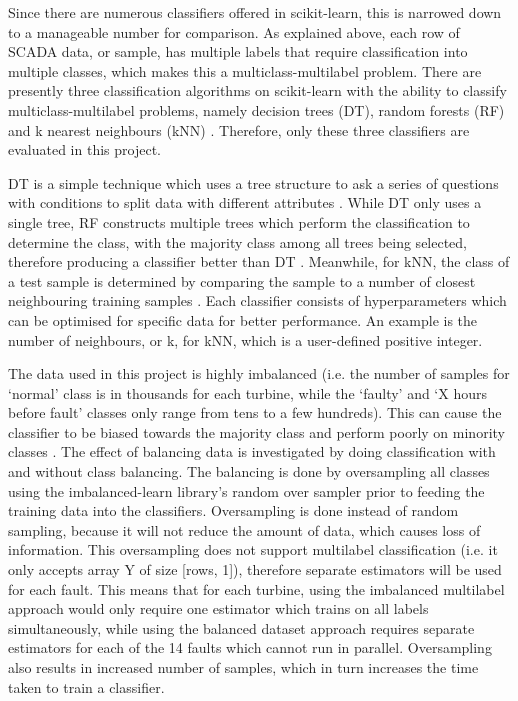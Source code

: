 Since there are numerous classifiers offered in scikit-learn, this is narrowed
down to a manageable number for comparison. As explained above, each row of
SCADA data, or sample, has multiple labels that require classification into
multiple classes, which makes this a multiclass-multilabel problem. There are
presently three classification algorithms on scikit-learn with the ability to
classify multiclass-multilabel problems, namely decision trees (DT), random
forests (RF) and k nearest neighbours (kNN) \cite{112}. Therefore, only these
three classifiers are evaluated in this project.

DT is a simple technique which uses a tree structure to ask a series of
questions with conditions to split data with different attributes
\cite{Decis10}. While DT only uses a single tree, RF constructs multiple trees
which perform the classification to determine the class, with the majority
class among all trees being selected, therefore producing a classifier better
than DT \cite{Rando}. Meanwhile, for kNN, the class of a test sample is
determined by comparing the sample to a number of closest neighbouring
training samples \cite{Sutto12,16N}. Each classifier consists of
hyperparameters which can be optimised for specific data for better
performance. An example is the number of neighbours, or k, for kNN, which is a
user-defined positive integer.

The data used in this project is highly imbalanced (i.e. the number of samples
for `normal' class is in thousands for each turbine, while the `faulty' and `X
hours before fault' classes only range from tens to a few hundreds). This can
cause the classifier to be biased towards the majority class and perform
poorly on minority classes \cite{110}. The effect of balancing data is
investigated by doing classification with and without class balancing. The
balancing is done by oversampling all classes using the imbalanced-learn
library's random over sampler \cite{Lemai} prior to feeding the training data
into the classifiers. Oversampling is done instead of random sampling, because
it will not reduce the amount of data, which causes loss of information. This
oversampling does not support multilabel classification (i.e. it only accepts
array Y of size [rows, 1]), therefore separate estimators will be used for
each fault. This means that for each turbine, using the imbalanced multilabel
approach would only require one estimator which trains on all labels
simultaneously, while using the balanced dataset approach requires separate
estimators for each of the 14 faults which cannot run in parallel.
Oversampling also results in increased number of samples, which in turn
increases the time taken to train a classifier.

